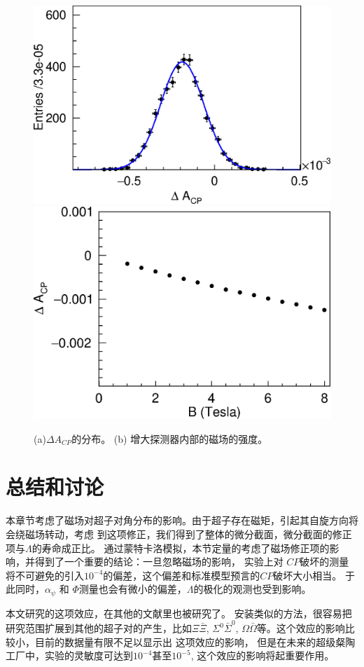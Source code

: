 \begin{figure}[htpb]
    \centering
        \includegraphics[width=0.9\linewidth]{figures/spin/afit.eps}
        \includegraphics[width=0.9\linewidth]{figures/spin/Acp.eps}
    \caption{(a)$\Delta A_{CP}$的分布。 
    (b) 增大探测器内部的磁场的强度。}%
    \label{fig:acpandvaryB}
\end{figure}
\section{总结和讨论}
本章节考虑了磁场对超子对角分布的影响。由于超子存在磁矩，引起其自旋方向将会绕磁场转动，考虑
到这项修正，我们得到了整体的微分截面，微分截面的修正项与$\Lambda$的寿命成正比。
通过蒙特卡洛模拟，本节定量的考虑了磁场修正项的影响，并得到了一个重要的结论：一旦忽略磁场的影响，
实验上对 $CP$破坏的测量将不可避免的引入$10^{-4}$的偏差，这个偏差和标准模型预言的$CP$破坏大小相当。
于此同时，$\alpha_{\psi}$ 和 $\Phi$测量也会有微小的偏差，$\Lambda$的极化的观测也受到影响。

本文研究的这项效应，在其他的文献里\cite{Kharzeev:2015znc,Guo:2019joy,Deng:2018frf}也被研究了。
安装类似的方法，很容易把研究范围扩展到其他的超子对的产生，比如$\Xi\bar{\Xi}$, $\Sigma^{0}
\bar{\Sigma}^{0}$, $\Omega\bar{\Omega}$等。这个效应的影响比较小，目前的数据量有限不足以显示出
这项效应的影响， 但是在未来的超级粲陶工厂中，实验的灵敏度可达到$10^{-4}$甚至$10^{-5}$\cite{Bigi:2017eni},
这个效应的影响将起重要作用。 
